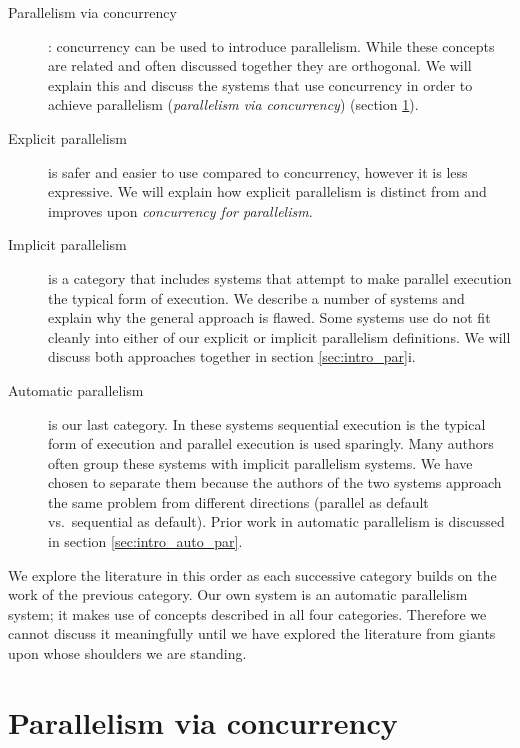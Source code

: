 \begin{description}
    \item[Parallelism via concurrency]:
    concurrency can be used to introduce parallelism.
    While these concepts are related and often discussed together they are
    orthogonal.
    We will explain this and discuss the systems that use concurrency in
    order to achieve parallelism (\emph{parallelism via concurrency})
    (section \ref{sec:intro_concurrency}).

    \item[Explicit parallelism] is safer and easier to use compared to
    concurrency, however it is less expressive.
    We will explain how explicit parallelism is distinct from and improves
    upon \emph{concurrency for parallelism}.
    
    \item[Implicit parallelism] is a category that includes 
    systems that attempt to make parallel execution the typical form of
    execution.
    We describe a number of systems and explain why the general approach is
    flawed.
    Some systems use do not fit cleanly into either of our explicit
    or implicit parallelism definitions.
    We will discuss both approaches together in section
    \ref{sec:intro_par}i.

    \item[Automatic parallelism] is our last category.
    In these systems sequential execution is the typical form of execution
    and parallel execution is used sparingly.
    Many authors often group these systems with implicit parallelism systems.
    We have chosen to separate them because the authors of the two systems
    approach the same problem from different directions
    (parallel as default vs.\ sequential as default).
    Prior work in automatic parallelism is discussed in section
    \ref{sec:intro_auto_par}.
\end{description}    

\noindent
We explore the literature in this order as each successive category builds
on the work of the previous category.
Our own system is an automatic parallelism system;
it makes use of concepts described in all four categories.
Therefore
we cannot discuss it meaningfully until we have explored the literature
from giants upon whose shoulders we are standing.


\section{Parallelism via concurrency}
\label{sec:intro_concurrency}

